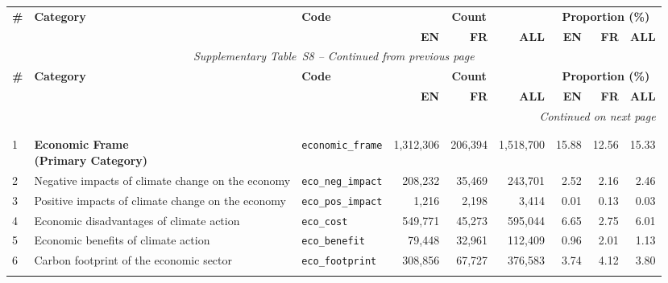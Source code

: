 \label{tab:database_distribution_s8}
\begin{longtable}{p{0.5cm}p{4.0cm}p{2.5cm}rrrrrr}
\toprule
\multirow{2}{*}{\textbf{\#}} & \multirow{2}{*}{\textbf{Category}} & \multirow{2}{*}{\textbf{Code}} & \multicolumn{3}{c}{\textbf{Count}} & \multicolumn{3}{c}{\textbf{Proportion (\%)}} \\
\cmidrule(lr){4-6} \cmidrule(lr){7-9}
& & & \textbf{EN} & \textbf{FR} & \textbf{ALL} & \textbf{EN} & \textbf{FR} & \textbf{ALL} \\
\midrule
\endfirsthead
\multicolumn{9}{c}{\textit{Supplementary Table~S8 -- Continued from previous page}} \\
\toprule
\multirow{2}{*}{\textbf{\#}} & \multirow{2}{*}{\textbf{Category}} & \multirow{2}{*}{\textbf{Code}} & \multicolumn{3}{c}{\textbf{Count}} & \multicolumn{3}{c}{\textbf{Proportion (\%)}} \\
\cmidrule(lr){4-6} \cmidrule(lr){7-9}
& & & \textbf{EN} & \textbf{FR} & \textbf{ALL} & \textbf{EN} & \textbf{FR} & \textbf{ALL} \\
\midrule
\endhead
\midrule
\multicolumn{9}{r}{\textit{Continued on next page}} \\
\endfoot
\bottomrule
\endlastfoot
\multicolumn{9}{l}{\cellcolor{gray!10}\textbf{MAIN FRAMES}} \\
\midrule
\rowcolor{gray!8}
\multicolumn{9}{l}{\textit{Economic Frame}} \\
\midrule
1 & \textbf{Economic Frame\newline (Primary Category)} & \texttt{economic\_frame} & 1,312,306 & 206,394 & 1,518,700 & 15.88 & 12.56 & 15.33 \\
\cmidrule(lr){1-9}
2 & Negative impacts of climate change on the economy & \texttt{eco\_neg\_impact} & 208,232 & 35,469 & 243,701 & 2.52 & 2.16 & 2.46 \\
3 & Positive impacts of climate change on the economy & \texttt{eco\_pos\_impact} & 1,216 & 2,198 & 3,414 & 0.01 & 0.13 & 0.03 \\
4 & Economic disadvantages of climate action & \texttt{eco\_cost} & 549,771 & 45,273 & 595,044 & 6.65 & 2.75 & 6.01 \\
5 & Economic benefits of climate action & \texttt{eco\_benefit} & 79,448 & 32,961 & 112,409 & 0.96 & 2.01 & 1.13 \\
6 & Carbon footprint of the economic sector & \texttt{eco\_footprint} & 308,856 & 67,727 & 376,583 & 3.74 & 4.12 & 3.80 \\
\midrule
\rowcolor{gray!8}
\multicolumn{9}{l}{\textit{Health Frame}} \\

\end{longtable}
